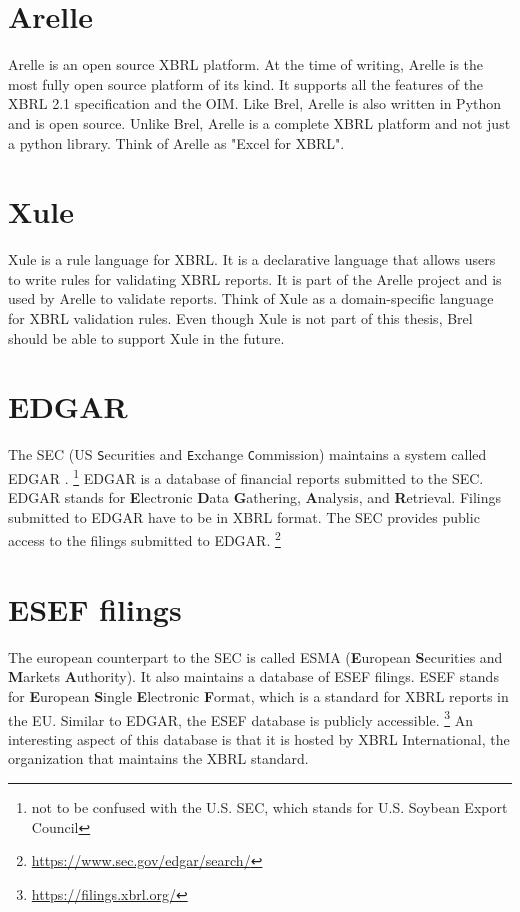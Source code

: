 \section{Arelle}
Arelle\cite{arelle} is an open source XBRL platform.
At the time of writing, Arelle is the most fully open source platform of its kind.
It supports all the features of the XBRL 2.1 specification and the OIM.
Like Brel, Arelle is also written in Python and is open source.
Unlike Brel, Arelle is a complete XBRL platform and not just a python library.
Think of Arelle as "Excel for XBRL".

\section{Xule}
Xule\cite{xule} is a rule language for XBRL.
It is a declarative language that allows users to write rules for validating XBRL reports.
It is part of the Arelle project and is used by Arelle to validate reports.
Think of Xule as a domain-specific language for XBRL validation rules.
Even though Xule is not part of this thesis, Brel should be able to support Xule in the future.

\section{EDGAR}
\label{sec:edgar}
The SEC (US \texttt{S}ecurities and \texttt{E}xchange \texttt{C}ommission) maintains a system called EDGAR \cite{sec_edgar}. \footnote{not to be confused with the U.S. SEC, which stands for U.S. Soybean Export Council}
EDGAR is a database of financial reports submitted to the SEC.
EDGAR stands for \textbf{E}lectronic \textbf{D}ata \textbf{G}athering, \textbf{A}nalysis, and \textbf{R}etrieval.
Filings submitted to EDGAR have to be in XBRL format.
The SEC provides public access to the filings submitted to EDGAR. \footnote{\url{https://www.sec.gov/edgar/search/}}

\section{ESEF filings}
The european counterpart to the SEC is called ESMA (\textbf{E}uropean \textbf{S}ecurities and \textbf{M}arkets \textbf{A}uthority).
It also maintains a database of ESEF filings\cite{esma_database}.
ESEF stands for \textbf{E}uropean \textbf{S}ingle \textbf{E}lectronic \textbf{F}ormat,
which is a standard for XBRL reports in the EU.
Similar to EDGAR, the ESEF database is publicly accessible. \footnote{\url{https://filings.xbrl.org/}}
An interesting aspect of this database is that it is hosted by XBRL International, the organization that maintains the XBRL standard.

